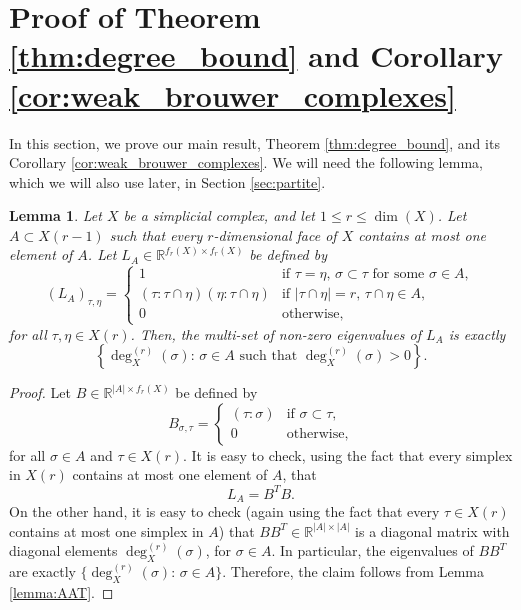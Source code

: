 \documentclass[a4paper,11pt]{article}
\theoremstyle{plain}
\newtheorem{lemma}[theorem]{\bf Lemma}
\theoremstyle{definition}
\numberwithin{theorem}{section}
\numberwithin{equation}{section}
\newcommand{\Rea}{{\mathbb R}}
\begin{document}
\section{Proof of Theorem \ref{thm:degree_bound} and Corollary \ref{cor:weak_brouwer_complexes}}\label{sec:main}


In this section, we prove our main result, Theorem \ref{thm:degree_bound}, and its Corollary \ref{cor:weak_brouwer_complexes}. 
We will need the following lemma, which we will also use later, in Section \ref{sec:partite}.

\begin{lemma}\label{lemma:LAminus}
    Let $X$ be a simplicial complex, and let $1\le r\le \dim(X)$. Let $A\subset X(r-1)$ such that every $r$-dimensional face of $X$ contains at most one element of $A$. Let $L_A\in \Rea^{f_r(X)\times f_r(X)}$ be defined by
    \[
    (L_A)_{\tau,\eta}=\begin{cases}
        1 & \text{if } \tau=\eta,\, \sigma\subset \tau \text{ for some } \sigma\in A,\\
        (\tau:\tau\cap \eta)(\eta:\tau\cap \eta) & \text{if } |\tau\cap \eta|=r,\, \tau\cap \eta\in A,\\
        0 & \text{otherwise,}
    \end{cases}
    \]
    for all $\tau,\eta\in X(r)$. Then, the multi-set of non-zero eigenvalues of $L_A$ is exactly
    \[
\left\{ \deg_X^{(r)}(\sigma):\, \sigma\in A \text{ such that } \deg_X^{(r)}(\sigma)>0\right\}.
    \]
\end{lemma}
\begin{proof}
    Let $B\in \Rea^{|A|\times f_r(X)}$ be defined by
    \[
        B_{\sigma,\tau}=\begin{cases}
            (\tau:\sigma) & \text{if } \sigma\subset \tau,\\
            0 & \text{otherwise,}
        \end{cases}
    \]
    for all $\sigma\in A$ and $\tau\in X(r)$.
    It is easy to check, using the fact that every simplex in $X(r)$ contains at most one element of $A$, that
    \[
        L_{A}= B^T B.
    \]
    On the other hand, it is easy to check (again using the fact that every $\tau\in X(r)$ contains at most one simplex in $A$) that $B B^T\in \Rea^{|A|\times |A|}$ is a diagonal matrix with diagonal elements $\deg_X^{(r)}(\sigma)$, for $\sigma\in A$. In particular, the eigenvalues of $B B^{T}$ are exactly $\{\deg_X^{(r)}(\sigma):\, \sigma\in A\}$. Therefore, the claim follows from Lemma \ref{lemma:AAT}.
\end{proof}
\end{document}
